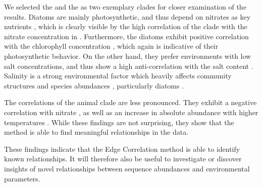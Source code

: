 We selected the  and the  as two exemplary clades for closer examination of the results.
Diatoms are mainly photosynthetic, and thus depend on nitrates as key nutrients \cite{Lozupone2007,Potapova2011},
which is clearly visible by the high correlation of the clade
with the nitrate concentration in .
Furthermore, the diatoms exhibit positive correlation
with the chlorophyll concentration ,
which again is indicative of their photosynthetic behavior.
On the other hand, they prefer environments with low salt concentrations, and thus show a high anti-correlation
with the salt content .
Salinity is a strong environmental factor which heavily affects community structures
and species abundances \cite{Lozupone2007}, particularly diatoms \cite{Potapova2011}.


The correlations of the animal clade are less pronounced.
They exhibit a negative correlation with nitrate ,
as well as an increase in absolute abundance with higher temperatures .
While these findings are not surprising,
they show that the method is able to find meaningful relationships in the data.

These findings indicate that the Edge Correlation method is able to identify known relationships.
It will therefore also be useful to investigate or discover
insights of novel relationships between sequence abundances and environmental parameters.


